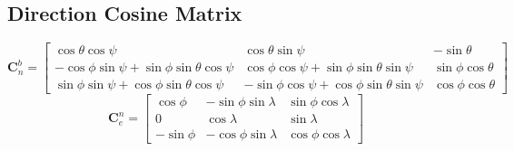 \subsection{Direction Cosine Matrix}
\[
    \bm{C}_n^b = \begin{bmatrix}
        \cos\theta\cos\psi & \cos\theta\sin\psi & -\sin\theta \\
        -\cos\phi\sin\psi+\sin\phi\sin\theta\cos\psi & \cos\phi\cos\psi+\sin\phi\sin\theta\sin\psi & \sin\phi\cos\theta \\
        \sin\phi\sin\psi+\cos\phi\sin\theta\cos\psi & -\sin\phi\cos\psi+\cos\phi\sin\theta\sin\psi & \cos\phi\cos\theta
    \end{bmatrix}
\]
\[
    \bm{C}_e^n = \begin{bmatrix}
        \cos\phi & -\sin\phi\sin\lambda & \sin\phi\cos\lambda \\
        0 & \cos\lambda & \sin\lambda \\
        -\sin\phi & -\cos\phi\sin\lambda & \cos\phi\cos\lambda
    \end{bmatrix}
\]


